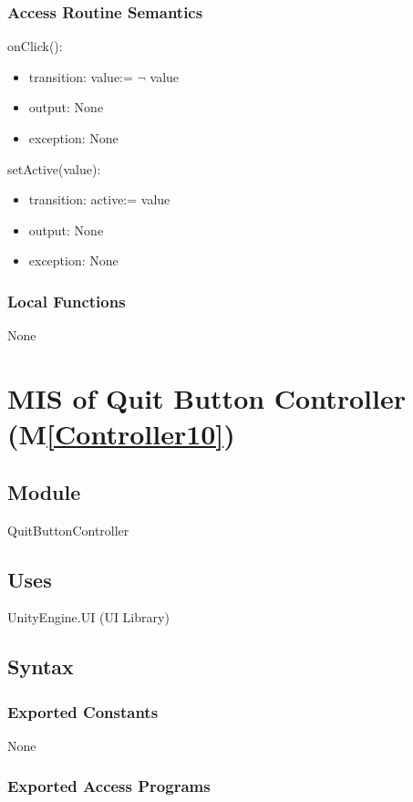 \documentclass[12pt, titlepage]{article}
\newcommand{\mref}[1]{M\ref{#1}}
\begin{document}
\subsubsection{Access Routine Semantics}

\noindent onClick():
\begin{itemize}
\item transition: value:= $\neg$ value
\item output: None
\item exception: None
\end{itemize}

\noindent setActive(value):
\begin{itemize}
\item transition: active:= value
\item output: None
\item exception: None
\end{itemize}

\subsubsection{Local Functions}
None 

\newpage

\section{MIS of Quit Button Controller (\mref{Controller10})} 

\subsection{Module}

QuitButtonController

\subsection{Uses}
UnityEngine.UI (UI Library)
\subsection{Syntax}

\subsubsection{Exported Constants}
None
\subsubsection{Exported Access Programs}
\end{document}
